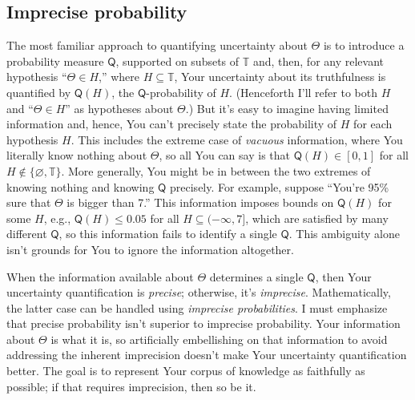 \documentclass[a4paper, 12pt]{article}
\theoremstyle{plain}
\theoremstyle{definition}
\theoremstyle{remark}
\newcommand{\prob}{\mathsf{P}}
\newcommand{\TT}{\mathbb{T}}
\newcommand{\prior}{\mathsf{Q}}
\begin{document}
\subsection{Imprecise probability}
\label{SS:ip}


The most familiar approach to quantifying uncertainty about $\Theta$ is to introduce a probability measure $\prior$, supported on subsets of $\TT$ and, then, for any relevant hypothesis ``$\Theta \in H$,'' where $H \subseteq \TT$, Your uncertainty about its truthfulness is quantified by $\prior(H)$, the $\prior$-probability of $H$. (Henceforth I'll refer to both $H$ and ``$\Theta \in H$'' as hypotheses about $\Theta$.) But it's easy to imagine having limited information and, hence, You can't precisely state the probability of $H$ for each hypothesis $H$.  This includes the extreme case of {\em vacuous} information, where You literally know nothing about $\Theta$, so all You can say is that $\prior(H) \in [0,1]$ for all $H \not\in \{\varnothing, \TT\}$.  More generally, You might be in between the two extremes of knowing nothing and knowing $\prior$ precisely.  For example, suppose ``You're 95\% sure that $\Theta$ is bigger than 7.''  This information imposes bounds on $\prior(H)$ for some $H$, e.g., $\prior(H) \leq 0.05$ for all $H \subseteq (-\infty, 7]$, which are satisfied by many different $\prior$, so this information fails to identify a single $\prior$.  This ambiguity alone isn't grounds for You to ignore the information altogether.

When the information available about $\Theta$ determines a single $\prior$, then Your uncertainty quantification is {\em precise}; otherwise, it's {\em imprecise}.  Mathematically, the latter case can be handled using {\em imprecise probabilities}.  I must emphasize that precise probability isn't superior to imprecise probability.  Your information about $\Theta$ is what it is, so artificially embellishing on that information to avoid addressing the inherent imprecision doesn't make Your uncertainty quantification better.  The goal is to represent Your corpus of knowledge as faithfully as possible; if that requires imprecision, then so be it. 
\end{document}
